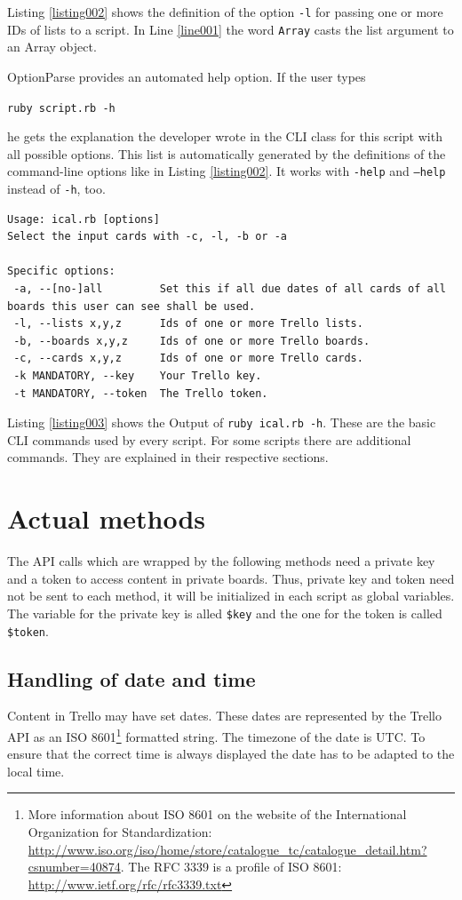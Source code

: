 Listing \ref{listing002} shows the definition of the option \texttt{-l} for passing one or more IDs of lists to a script. In Line \ref{line001} the word \lstinline{Array} casts the list argument to an Array object.

OptionParse provides an automated help option. If the user types 
\begin{center}
\texttt{ruby script.rb -h} 
\end{center}
he gets the explanation the developer wrote in the CLI class for this script with all possible options. This list is automatically generated by the definitions of the command-line options like in Listing \ref{listing002}. It works with \texttt{-help} and \texttt{--help} instead of \texttt{-h}, too.

\begin{lstlisting}[aboveskip=1\baselineskip, style=bash, caption=Output of the \texttt{-h} option., label=listing003]
Usage: ical.rb [options]
Select the input cards with -c, -l, -b or -a

Specific options:
 -a, --[no-]all         Set this if all due dates of all cards of all boards this user can see shall be used.
 -l, --lists x,y,z      Ids of one or more Trello lists.
 -b, --boards x,y,z     Ids of one or more Trello boards.
 -c, --cards x,y,z      Ids of one or more Trello cards.
 -k MANDATORY, --key    Your Trello key.
 -t MANDATORY, --token  The Trello token.
\end{lstlisting}

Listing \ref{listing003} shows the Output of \texttt{ruby ical.rb -h}. 
These are the basic CLI commands used by every script. For some scripts there are additional commands. They are explained in their respective sections.

\section{Actual methods} 
The API calls which are wrapped by the following methods need a private key and a token to access content in private boards. Thus, private key and token need not be sent to each method, it will be initialized in each script as global variables. The variable for the private key is alled \lstinline{$key} and the one for the token is called \lstinline{$token}.

\subsection{Handling of date and time}
Content in Trello may have set dates. These dates are represented by the Trello API as an ISO 8601\footnote{More information about ISO 8601 on the website of the International Organization for Standardization: \url{http://www.iso.org/iso/home/store/catalogue_tc/catalogue_detail.htm?csnumber=40874}. The RFC 3339 is a profile of ISO 8601: \url{http://www.ietf.org/rfc/rfc3339.txt}} formatted string. The timezone of the date is UTC. To ensure that the correct time is always displayed the date has to be adapted to the local time. 

